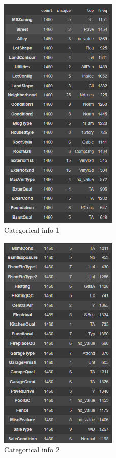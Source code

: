 \begin{figure}[h!]
    \centering
    \includegraphics[width=0.5\textwidth]{imgs/info3.png}
    \caption{Categorical info 1}
    \label{fig:info3}
\end{figure}

\begin{figure}[h!]
    \centering
    \includegraphics[width=0.5\textwidth]{imgs/info4.png}
    \caption{Categorical info 2}
    \label{fig:info4}
\end{figure}
